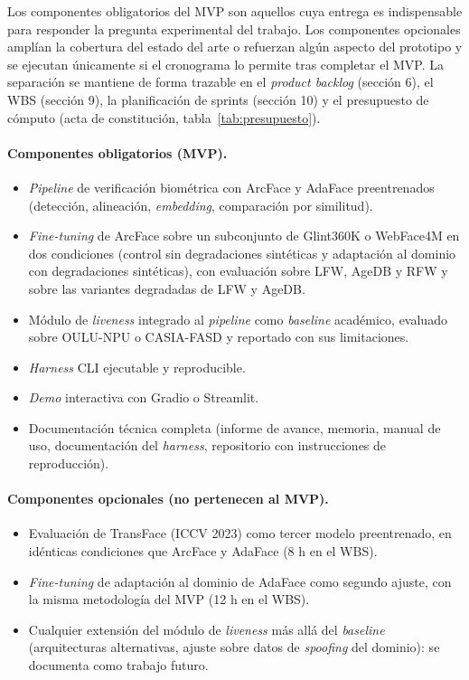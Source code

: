 \documentclass[
  11pt, %
]{charter}
\begin{document}
Los componentes obligatorios del MVP son aquellos cuya entrega es indispensable para responder la pregunta experimental del trabajo. Los componentes opcionales amplían la cobertura del estado del arte o refuerzan algún aspecto del prototipo y se ejecutan únicamente si el cronograma lo permite tras completar el MVP. La separación se mantiene de forma trazable en el \textit{product backlog} (sección 6), el WBS (sección 9), la planificación de sprints (sección 10) y el presupuesto de cómputo (acta de constitución, tabla~\ref{tab:presupuesto}).

\paragraph{Componentes obligatorios (MVP).}
\begin{itemize}
  \item \textit{Pipeline} de verificación biométrica con ArcFace y AdaFace preentrenados (detección, alineación, \textit{embedding}, comparación por similitud).
  \item \textit{Fine-tuning} de ArcFace sobre un subconjunto de Glint360K o WebFace4M en dos condiciones (control sin degradaciones sintéticas y adaptación al dominio con degradaciones sintéticas), con evaluación sobre LFW, AgeDB y RFW y sobre las variantes degradadas de LFW y AgeDB.
  \item Módulo de \textit{liveness} integrado al \textit{pipeline} como \textit{baseline} académico, evaluado sobre OULU-NPU o CASIA-FASD y reportado con sus limitaciones.
  \item \textit{Harness} CLI ejecutable y reproducible.
  \item \textit{Demo} interactiva con Gradio o Streamlit.
  \item Documentación técnica completa (informe de avance, memoria, manual de uso, documentación del \textit{harness}, repositorio con instrucciones de reproducción).
\end{itemize}

\paragraph{Componentes opcionales (no pertenecen al MVP).}
\begin{itemize}
  \item Evaluación de TransFace (ICCV 2023) como tercer modelo preentrenado, en idénticas condiciones que ArcFace y AdaFace (8 h en el WBS).
  \item \textit{Fine-tuning} de adaptación al dominio de AdaFace como segundo ajuste, con la misma metodología del MVP (12 h en el WBS).
  \item Cualquier extensión del módulo de \textit{liveness} más allá del \textit{baseline} (arquitecturas alternativas, ajuste sobre datos de \textit{spoofing} del dominio): se documenta como trabajo futuro.
\end{itemize}
\end{document}
